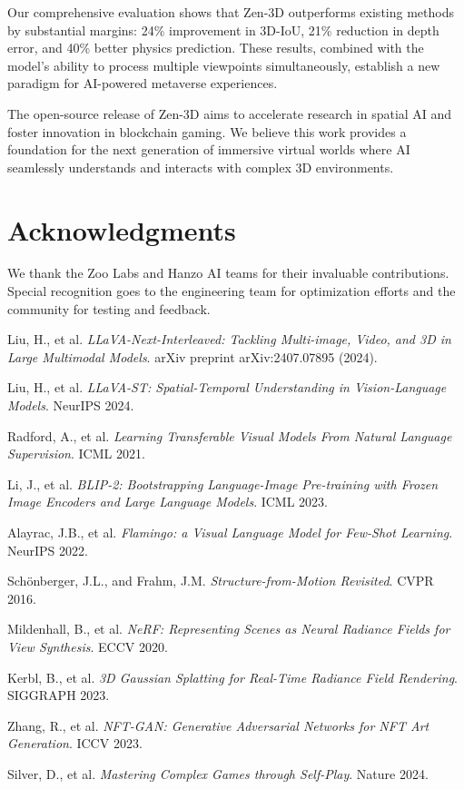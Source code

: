 \documentclass[11pt,a4paper]{article}
\begin{document}
Our comprehensive evaluation shows that Zen-3D outperforms existing methods by substantial margins: 24\% improvement in 3D-IoU, 21\% reduction in depth error, and 40\% better physics prediction. These results, combined with the model's ability to process multiple viewpoints simultaneously, establish a new paradigm for AI-powered metaverse experiences.

The open-source release of Zen-3D aims to accelerate research in spatial AI and foster innovation in blockchain gaming. We believe this work provides a foundation for the next generation of immersive virtual worlds where AI seamlessly understands and interacts with complex 3D environments.

\section*{Acknowledgments}

We thank the Zoo Labs and Hanzo AI teams for their invaluable contributions. Special recognition goes to the engineering team for optimization efforts and the community for testing and feedback.


\begin{thebibliography}{10}

Liu, H., et al.
\textit{LLaVA-Next-Interleaved: Tackling Multi-image, Video, and 3D in Large Multimodal Models}.
arXiv preprint arXiv:2407.07895 (2024).

Liu, H., et al.
\textit{LLaVA-ST: Spatial-Temporal Understanding in Vision-Language Models}.
NeurIPS 2024.

Radford, A., et al.
\textit{Learning Transferable Visual Models From Natural Language Supervision}.
ICML 2021.

Li, J., et al.
\textit{BLIP-2: Bootstrapping Language-Image Pre-training with Frozen Image Encoders and Large Language Models}.
ICML 2023.

Alayrac, J.B., et al.
\textit{Flamingo: a Visual Language Model for Few-Shot Learning}.
NeurIPS 2022.

Schönberger, J.L., and Frahm, J.M.
\textit{Structure-from-Motion Revisited}.
CVPR 2016.

Mildenhall, B., et al.
\textit{NeRF: Representing Scenes as Neural Radiance Fields for View Synthesis}.
ECCV 2020.

Kerbl, B., et al.
\textit{3D Gaussian Splatting for Real-Time Radiance Field Rendering}.
SIGGRAPH 2023.

Zhang, R., et al.
\textit{NFT-GAN: Generative Adversarial Networks for NFT Art Generation}.
ICCV 2023.

Silver, D., et al.
\textit{Mastering Complex Games through Self-Play}.
Nature 2024.

\end{thebibliography}
\end{document}
